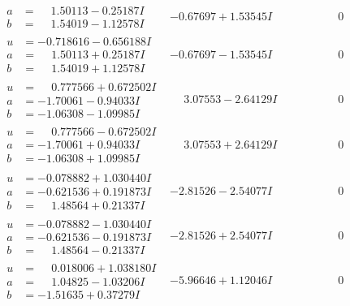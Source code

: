 \documentclass[1p]{elsarticle_modified}
\theoremstyle{definition}
\begin{document}
$$\begin{array}{c|c|c}
\begin{aligned}
a &= \phantom{-}1.50113 - 0.25187 I \\
b &= \phantom{-}1.54019 - 1.12578 I\end{aligned}
 & -0.67697 + 1.53545 I & \phantom{-0.000000 } 0 \\ \hline\begin{aligned}
u &= -0.718616 - 0.656188 I \\
a &= \phantom{-}1.50113 + 0.25187 I \\
b &= \phantom{-}1.54019 + 1.12578 I\end{aligned}
 & -0.67697 - 1.53545 I & \phantom{-0.000000 } 0 \\ \hline\begin{aligned}
u &= \phantom{-}0.777566 + 0.672502 I \\
a &= -1.70061 - 0.94033 I \\
b &= -1.06308 - 1.09985 I\end{aligned}
 & \phantom{-}3.07553 - 2.64129 I & \phantom{-0.000000 } 0 \\ \hline\begin{aligned}
u &= \phantom{-}0.777566 - 0.672502 I \\
a &= -1.70061 + 0.94033 I \\
b &= -1.06308 + 1.09985 I\end{aligned}
 & \phantom{-}3.07553 + 2.64129 I & \phantom{-0.000000 } 0 \\ \hline\begin{aligned}
u &= -0.078882 + 1.030440 I \\
a &= -0.621536 + 0.191873 I \\
b &= \phantom{-}1.48564 + 0.21337 I\end{aligned}
 & -2.81526 - 2.54077 I & \phantom{-0.000000 } 0 \\ \hline\begin{aligned}
u &= -0.078882 - 1.030440 I \\
a &= -0.621536 - 0.191873 I \\
b &= \phantom{-}1.48564 - 0.21337 I\end{aligned}
 & -2.81526 + 2.54077 I & \phantom{-0.000000 } 0 \\ \hline\begin{aligned}
u &= \phantom{-}0.018006 + 1.038180 I \\
a &= \phantom{-}1.04825 - 1.03206 I \\
b &= -1.51635 + 0.37279 I\end{aligned}
 & -5.96646 + 1.12046 I & \phantom{-0.000000 } 0 \\ \hline\begin{aligned}

\end{aligned}
\end{array}$$
\end{document}
